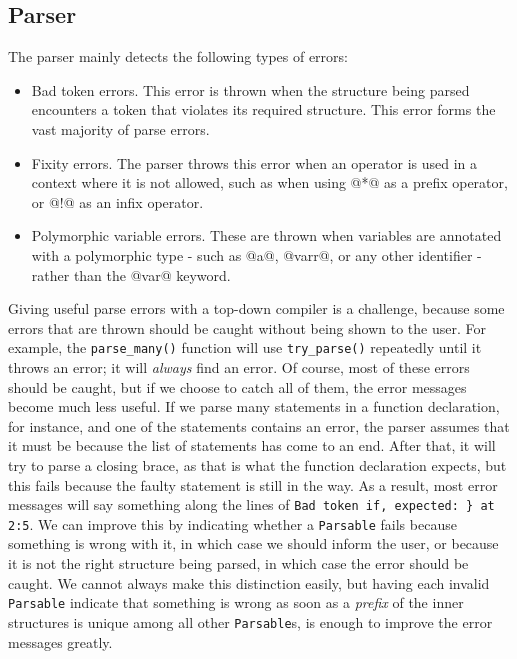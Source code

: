 \subsection{Parser}
The parser mainly detects the following types of errors:

\begin{itemize}
    \item Bad token errors. This error is thrown when the structure being parsed encounters a token that violates its required structure. This error forms the vast majority of parse errors.
    \item Fixity errors. The parser throws this error when an operator is used in a context where it is not allowed, such as when using @*@ as a prefix operator, or @!@ as an infix operator.
    \item Polymorphic variable errors. These are thrown when variables are annotated with a polymorphic type - such as @a@, @varr@, or any other identifier - rather than the @var@ keyword.
\end{itemize}

Giving useful parse errors with a top-down compiler is a challenge, because some errors that are thrown should be caught without being shown to the user. For example, the \lstinline[language=rust]|parse_many()| function will use \lstinline[language=rust]|try_parse()| repeatedly until it throws an error; it will \textit{always} find an error. Of course, most of these errors should be caught, but if we choose to catch all of them, the error messages become much less useful. If we parse many statements in a function declaration, for instance, and one of the statements contains an error, the parser assumes that it must be because the list of statements has come to an end. After that, it will try to parse a closing brace, as that is what the function declaration expects, but this fails because the faulty statement is still in the way. As a result, most error messages will say something along the lines of \lstinline[language={}]|Bad token if, expected: } at 2:5|. We can improve this by indicating whether a \lstinline[language=rust]|Parsable| fails because something is wrong with it, in which case we should inform the user, or because it is not the right structure being parsed, in which case the error should be caught. We cannot always make this distinction easily, but having each invalid \lstinline[language=rust]|Parsable| indicate that something is wrong as soon as a \textit{prefix} of the inner structures is unique among all other \lstinline[language=rust]|Parsable|s, is enough to improve the error messages greatly.

